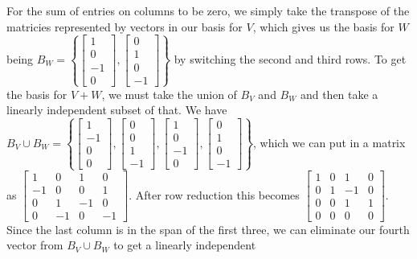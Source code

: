 \documentclass{article}
\begin{document}
	For the sum of entries on columns to be zero, we simply take the transpose of the matricies represented by vectors in our basis for $V$, which gives us the basis for $W$ being $B_W = \left \{ \begin{bmatrix}1\\0\\-1\\0\end{bmatrix}, \begin{bmatrix}0\\1\\0\\-1\end{bmatrix} \right\}$ by switching the second and third rows. To get the basis for $V+W$, we must take the union of $B_V$ and $B_W$ and then take a linearly independent subset of that. We have $B_V \cup B_W = \left \{\begin{bmatrix}1\\-1\\0\\0\end{bmatrix}, \begin{bmatrix}0\\0\\1\\-1\end{bmatrix},\begin{bmatrix}1\\0\\-1\\0\end{bmatrix}, \begin{bmatrix}0\\1\\0\\-1\end{bmatrix} \right\}$, which we can put in a matrix as $\begin{bmatrix}1&0&1&0\\-1&0&0&1\\0&1&-1&0\\0&-1&0&-1\end{bmatrix}$. After row reduction this becomes $\begin{bmatrix}1&0&1&0\\0&1&-1&0\\0&0&1&1\\0&0&0&0\end{bmatrix}$. Since the last column is in the span of the first three, we can eliminate our fourth vector from $B_V \cup B_W$ to get a linearly independent 
\end{document}
